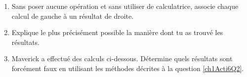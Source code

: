 


\begin{activite}

\begin{enumerate}
 \item Sans poser aucune opération et sans utiliser de calculatrice, associe chaque calcul de gauche à un résultat de droite. 
 \item Explique le plus précisément possible la manière dont tu as trouvé les résultats.\label{ch1Acti6Q2}
 \item Maverick a effectué des calculs ci-dessous. Détermine quels résultats sont forcément faux en utilisant les méthodes décrites à la question \ref{ch1Acti6Q2}.
 \end{enumerate}
 
 \end{activite}




